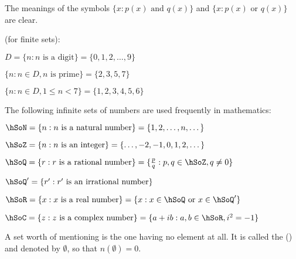 \documentclass[11pt]{amsbook}
\begin{document}

The meanings of the symbols
$ \{ x: p(x) \text{ and } q(x) \} $
and
$ \{x: p(x) \text{ or } q(x)\} $
are clear.

\begin{exmp} 
	(for finite sets):
	
	\begin{hEnumerateArabic}	 
		\item
		$ D = \{ n: n \text{ is a digit} \} = \{ 0, 1, 2, \dotsc, 9 \} $
	 
		\item
		$ \{ n: n \in D, n \text{ is prime} \} = \{ 2, 3, 5, 7 \} $
	 
		\item
		$ \{ n: n \in D, 1 \leq n < 7 \} = \{ 1, 2, 3, 4, 5, 6 \} $	 
	\end{hEnumerateArabic} 
\end{exmp}


\begin{exmp} 
	The following infinite sets of numbers are used frequently in mathematics:
	
	\begin{hEnumerateArabic}	 
		\item
		$ \hSoN = \{ n : n \text{ is a natural number} \} = \{ 1, 2, \dotsc, n, \dotsc \} $
		
		\item
		$ \hSoZ = \{ n : n \text{ is an integer} \} = \{ \dotsc, -2, -1, 0, 1, 2, \dotsc \} $
		
		\item
		$ \hSoQ = \{ r : r \text{ is a rational number} \} = \{ \frac{p}{q} : p, q \in \hSoZ, q \neq 0 \} $
		
		\item
		$ \hSoQ'= \{ r' : r' \text{ is an irrational number} \} $

		\item
		$ \hSoR = \{ x : x \text{ is a real number} \} = \{ x : x \in \hSoQ \text{ or } x \in \hSoQ' \} $
		
		\item
		$ \hSoC = \{ z : z \text{ is a complex number} \} = \{ a + ib : a, b \in \hSoR, i^{2} = -1 \} $	 
	\end{hEnumerateArabic} 
\end{exmp}


A set worth of mentioning is the one having no element at all. 
It is called the  () and denoted by
$ \emptyset $,
so that
$ n(\emptyset) = 0 $.
\end{document}
